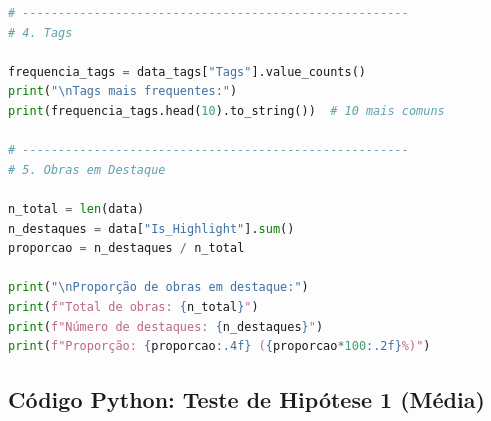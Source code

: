 \documentclass[11pt,a4paper]{article}
\begin{document}
\begin{lstlisting}[language=Python]
# ------------------------------------------------------
# 4. Tags

frequencia_tags = data_tags["Tags"].value_counts()
print("\nTags mais frequentes:")
print(frequencia_tags.head(10).to_string())  # 10 mais comuns

# ------------------------------------------------------
# 5. Obras em Destaque

n_total = len(data)
n_destaques = data["Is_Highlight"].sum()
proporcao = n_destaques / n_total

print("\nProporção de obras em destaque:")
print(f"Total de obras: {n_total}")
print(f"Número de destaques: {n_destaques}")
print(f"Proporção: {proporcao:.4f} ({proporcao*100:.2f}%)")
\end{lstlisting}

\subsection*{Código Python: Teste de Hipótese 1 (Média)}
\label{anx:codigo_hipotese1}
\end{document}
